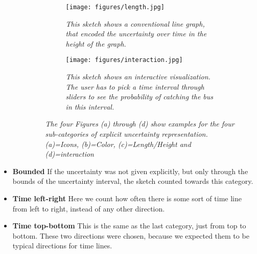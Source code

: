 \begin{itemize}
\begin{itemize}
\begin{figure}[h]
			\medskip
			
			\begin{subfigure}[t]{.4\textwidth}
				\centering
				\texttt{[image: figures/length.jpg]}
				\caption{\textit{This sketch shows a conventional line graph, that encoded the uncertainty over time in the height of the graph.}}
				\label{fig:length}
			\end{subfigure}
			\hfill
			\begin{subfigure}[t]{.4\textwidth}
				\centering
				\texttt{[image: figures/interaction.jpg]}
				\caption{\textit{This sketch shows an interactive visualization. The user has to pick a time interval through sliders to see the probability of catching the bus in this interval.}}
				\label{fig:interaction}
			\end{subfigure}
			\label{fig:explicit}
			\caption{\textit{The four Figures (a) through (d) show examples for the four sub-categories of explicit uncertainty representation. (a)=Icons, (b)=Color, (c)=Length/Height and (d)=interaction}}
		\end{figure}
		
		
	\end{itemize}
	\item \textbf{Bounded} If the uncertainty was not given explicitly, but only through the bounds of the uncertainty interval, the sketch counted towards this category.
	\item \textbf{Time left-right} Here we count how often there is some sort of time line from left to right, instead of any other direction.
	\item \textbf{Time top-bottom} This is the same as the last category, just from top to bottom. These two directions were chosen, because we expected them to be typical directions for time lines.
\end{itemize}

